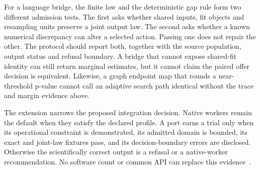For a language bridge, the finite law and the deterministic gap rule form two
different admission tests. The first asks whether shared inputs, fit objects
and resampling units preserve a joint output law. The second asks whether a
known numerical discrepancy can alter a selected action. Passing one does not
repair the other. The protocol should report both, together with the source
population, output status and refusal boundary. A bridge that cannot expose
shared-fit identity can still return marginal estimates, but it cannot claim
the paired offer decision is equivalent. Likewise, a graph endpoint map that
rounds a near-threshold p-value cannot call an adaptive search path identical
without the trace and margin evidence above.

The extension narrows the proposed integration decision. Native workers remain
the default when they satisfy the declared profile. A port earns a trial only
when its operational constraint is demonstrated, its admitted domain is
bounded, its exact and joint-law fixtures pass, and its decision-boundary
errors are disclosed. Otherwise the scientifically correct output is a
refusal or a native-worker recommendation. No software count or common API
can replace this evidence~\citep{exec17_s9_admission,exec17_s9_route_decisions}.
